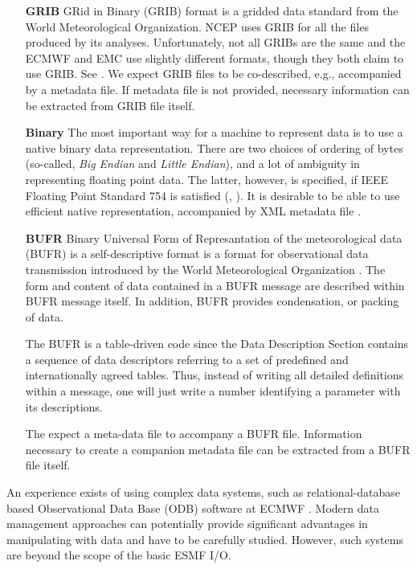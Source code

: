 \begin{itemize}
\item[\bf GRIB] GRid in Binary (GRIB) format is a gridded data
standard from the World Meteorological Organization. NCEP uses GRIB
for all the files produced by its analyses. Unfortunately, not all
GRIBs are the same and the ECMWF and EMC use slightly different
formats, though they both claim to use GRIB. See \cite{GRIB_1}.
We expect GRIB files to be co-described, e.g., accompanied by a metadata file.
If metadata file is not provided, necessary information can be extracted from 
GRIB file itself.

\item[\bf Binary]
The most important way for a machine to represent data is to use a
native binary data representation. There are  two choices of ordering of 
bytes (so-called, {\it Big Endian} and {\it Little Endian}), and a lot of
ambiguity in representing floating point data. The latter, however, is
specified, if IEEE Floating Point Standard 754 is satisfied 
(\cite{IEEE-Floating-Point}, \cite{Kahan-IEEE-754}). It is
desirable to be able to use efficient native representation,
accompanied by XML metadata file \cite{XML-W3C}. 

\item[\bf BUFR] Binary Universal Form of Represantation of the meteorological 
data (BUFR) is a self-descriptive format is a format for observational data 
transmission introduced by the World Meteorological Organization 
\cite{WMO-BUFR-CREX}. The form and content of data contained in a BUFR 
message are described within BUFR message itself. In addition, BUFR provides 
condensation, or packing of data. 

The BUFR is a table-driven code since the Data Description Section
contains a sequence of data descriptors referring to a set of predefined and 
internationally agreed tables. Thus, instead of writing all detailed
definitions within a message, one will just write a number identifying
a parameter with its descriptions.

The expect a meta-data file to accompany a BUFR file. Information necessary 
to create a companion metadata file can be extracted from a BUFR file itself. 
\end{itemize}

An experience exists of using complex data systems, such as 
relational-database based Observational Data Base (ODB) software at  ECMWF
\cite{ODB}. Modern data management approaches can potentially provide 
significant advantages in manipulating with data and have to be carefully 
studied. However, such systems are beyond the scope of the basic ESMF I/O. 


